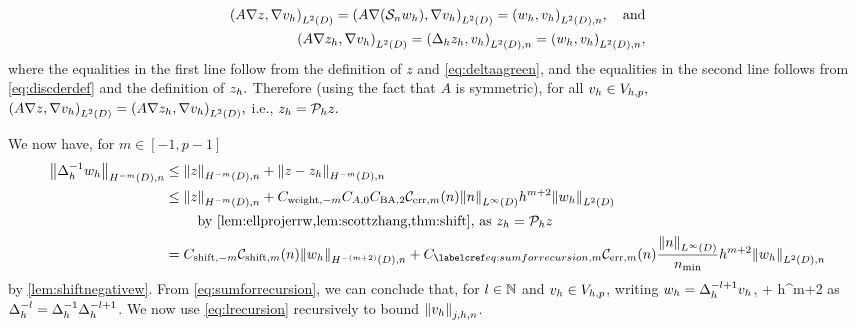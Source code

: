 \begin{align*}
\IPLtD{A \grad z}{\grad \vh} = \IPLtD{A \grad \mleft(\sdsol \wh\mright)}{\grad \vh} = \IPLtDn{\wh}{\vh},\quad \text{and}\\
\IPLtD{A \grad \zh}{\grad \vh} = \IPLtDn{\Deltah \zh}{\vh} = \IPLtDn{\wh}{\vh},
\end{align*}
where the equalities in the first line follow from the definition of $z$ and \cref{eq:deltaagreen}, and the equalities in the second line follows from \cref{eq:discderdef} and the definition of $z_{h}.$  Therefore (using the fact that $A$ is symmetric), for all $v_{h} \in V_{h,p},$ $\IPLtD{A\grad z}{\grad \vh} = \IPLtD{A\grad \zh}{\grad \vh},$ i.e., $z_{h} = \mathcal P_{h} z.$

We now have, for $m \in [-1,p-1]$
\begin{align}
\NHnfn{-m}{D}{\DeltahI \wh} &\leq \NHnfn{-m}{D}{z} + \NHnfn{-m}{D}{z-\zh}\nonumber\\
&\leq \NHnfn{-m}{D}{z} + \Cwfn{-m}  \CAfn{0} \CSZfn{2} \errn{m} \NLiD{n} h^{m+2} \NLtD{\wh}\nonumber\\
&\quad\quad\text{ by \cref{lem:ellprojerrw,lem:scottzhang,thm:shift}, as }\zh = \Ph z\nonumber\\
&= \Cshiftfn{m} \shiftn{m} \NHnfn{-(m+2)}{D}{\wh} + \Cm \errn{m} \frac{\NLiD{n}}{\nmin} h^{m+2} \NLtDn{\wh}\label{eq:sumforrecursion}
\end{align}
by \cref{lem:shiftnegativew}.
From \cref{eq:sumforrecursion}, we can conclude that, for $l \in \mathbb N$ and $v_{h} \in V_{h,p}$, writing $w_{h} = \Delta_{h}^{-l+1} v_{h}$,
\beq\label{eq:lrecursion}
 \leq {}  + \Cm {}  h^{m+2} \NLtDn{\Deltahmlpo \vh}
\eeq
as $\Delta_{h}^{-l} = \Delta_{h}^{-1} \Delta_{h}^{-l+1}$. We now use \cref{eq:lrecursion} recursively to bound $\Nfn{j,h,n}{\vh}$.

